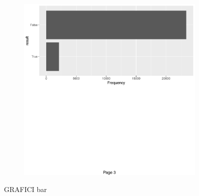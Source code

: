 \begin{figure}[htb]
	\begin{subfigure}[t]{0.475\textwidth}
	\includegraphics[width=\textwidth]{images/ml/plot_bar3}
	\end{subfigure}
	\caption{GRAFICI bar}
	\label{fig:plot_bar}
\end{figure}

